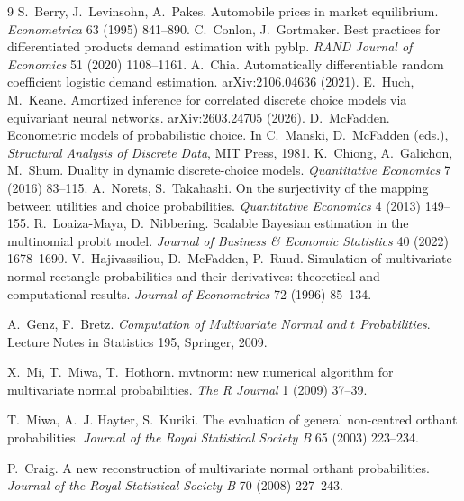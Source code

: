\documentclass[12pt]{article}
\theoremstyle{remark}
\begin{document}
\begin{thebibliography}{9}
 S.~Berry, J.~Levinsohn, A.~Pakes. Automobile prices in
market equilibrium. \emph{Econometrica} 63 (1995) 841--890.
 C.~Conlon, J.~Gortmaker. Best practices for
differentiated products demand estimation with pyblp. \emph{RAND Journal of
Economics} 51 (2020) 1108--1161.
 A.~Chia. Automatically differentiable random coefficient
logistic demand estimation. arXiv:2106.04636 (2021).
 E.~Huch, M.~Keane. Amortized inference for correlated
discrete choice models via equivariant neural networks. arXiv:2603.24705
(2026).
 D.~McFadden. Econometric models of probabilistic
choice. In C.~Manski, D.~McFadden (eds.), \emph{Structural Analysis of
Discrete Data}, MIT Press, 1981.
 K.~Chiong, A.~Galichon, M.~Shum. Duality in dynamic
discrete-choice models. \emph{Quantitative Economics} 7 (2016) 83--115.
 A.~Norets, S.~Takahashi. On the surjectivity of the
mapping between utilities and choice probabilities. \emph{Quantitative
Economics} 4 (2013) 149--155.
 R.~Loaiza-Maya, D.~Nibbering. Scalable Bayesian
estimation in the multinomial probit model. \emph{Journal of Business \&
Economic Statistics} 40 (2022) 1678--1690.
 V.~Hajivassiliou, D.~McFadden, P.~Ruud. Simulation of
multivariate normal rectangle probabilities and their derivatives:
theoretical and computational results. \emph{Journal of Econometrics} 72
(1996) 85--134.

 A.~Genz, F.~Bretz.
\emph{Computation of Multivariate Normal and $t$ Probabilities}. Lecture
Notes in Statistics 195, Springer, 2009.

 X.~Mi, T.~Miwa,
T.~Hothorn. mvtnorm: new numerical algorithm for multivariate normal
probabilities. \emph{The R Journal} 1 (2009) 37--39.

 T.~Miwa,
A.~J. Hayter, S.~Kuriki. The evaluation of general non-centred orthant
probabilities. \emph{Journal of the Royal Statistical Society B} 65
(2003) 223--234.

 P.~Craig. A new reconstruction of
multivariate normal orthant probabilities. \emph{Journal of the Royal
Statistical Society B} 70 (2008) 227--243.


\end{thebibliography}
\end{document}
